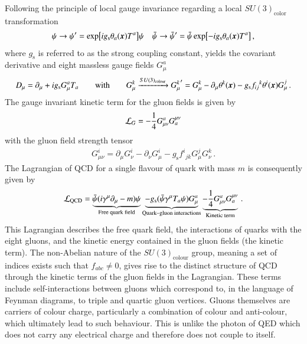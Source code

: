 Following the principle of local gauge invariance regarding a local
$SU(3)_{\text{color}}$ transformation
\begin{align*}
  \psi \to \psi^\prime = \exp[ i g_{\text{s}} \theta_a(\myvec{x}) T^a] \psi
  &&\bar{\psi} \to \bar{\psi}^\prime = \bar{\psi} \exp[ - i g_{\text{s}} \theta_a(\myvec{x}) T^a]  \,\text{,}
\end{align*}
where $g_{\text{s}}$ is referred to as the strong coupling constant, yields the
covariant derivative and eight massless gauge fields $G_\mu^a$
\begin{align*}
  D_\mu = \partial_\mu + i g_{\text{s}} G_\mu^a T_a
  \qquad \text{with} \qquad
  G_\mu^k \xrightarrow{SU(3)_{\text{colour}}} {G_\mu^k}^\prime = G_\mu^k  - \partial_\mu \theta^k(\myvec{x}) - g_{\text{s}} {f_{ij}}^k \theta^i(\myvec{x}) G_\mu^j \,\text{.}
\end{align*}
The gauge invariant kinetic term for the gluon fields is given by
\begin{align*}
  \mathcal{L}_{G} = - \frac{1}{4} G_{\mu\nu}^{a} G^{\mu\nu}_{a}
\end{align*}
with the gluon field strength tensor
\begin{align*}
  G_{\mu\nu}^i = \partial_\mu G_\nu^i - \partial_\nu G_\mu^i - g_{\text{s}} {f^{i}}_{jk} G_\mu^j G_\nu ^k \,\text{.}
\end{align*}
The Lagrangian of QCD for a single flavour of quark with mass $m$ is
consequently given by
\begin{align}
  \mathcal{L}_{\text{QCD}} =
  \underbrace{\bar{\psi} (i \gamma^\mu \partial_\mu - m) \psi}_{\text{Free quark field}}
  \underbrace{- g_{\text{s}} (\bar{\psi} \gamma^\mu T_a \psi) G_\mu^a}_{\text{Quark--gluon interactions}}
  \underbrace{- \frac{1}{4} G_{\mu\nu}^a G^{\mu\nu}_a}_{\text{Kinetic term}} \,\text{.}
  \label{eq:qcd_lagrangian}
\end{align}
This Lagrangian describes the free quark field, the interactions of quarks with
the eight gluons, and the kinetic energy contained in the gluon fields (the
kinetic term). The non-Abelian nature of the $SU(3)_{\text{colour}}$ group,
meaning a set of indices exists such that $f_{abc} \neq 0$, gives rise to the
distinct structure of QCD through the kinetic terms of the gluon fields in the
Lagrangian. These terms include self-interactions between gluons which
correspond to, in the language of Feynman diagrams, to triple and quartic gluon
vertices. Gluons themselves are carriers of colour charge, particularly a
combination of colour and anti-colour, which ultimately lead to such
behaviour. This is unlike the photon of QED which does not carry any electrical
charge and therefore does not couple to itself.


